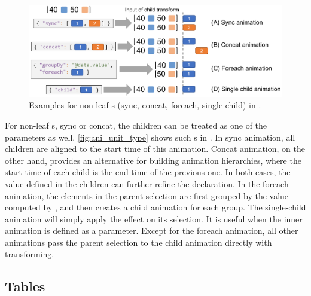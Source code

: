 \begin{figure}[h]
  \centering
  \includegraphics[width=\linewidth]{figs/ani_unit_type.pdf}
  \caption{
    Examples for non-leaf \aniunit{}s (sync, concat, foreach, single-child) in \gaia{}.
  }
  \label{fig:ani_unit_type}
\end{figure}

For non-leaf \aniunit{}s, \eg sync or concat, the children can be treated as one of the parameters as well.
\autoref{fig:ani_unit_type} shows such \aniunit{}s in \gaia{}.
In sync animation, all children are aligned to the start time of this animation.
Concat animation, on the other hand, provides an alternative for building animation hierarchies, where the start time of each child is the end time of the previous one.
In both cases, the  value defined in the children can further refine the declaration.
In the foreach animation, the elements in the parent selection are first grouped by the value computed by , and then \gaia{} creates a child animation for each group.
The single-child animation will simply apply the effect on its selection.
It is useful when the inner animation is defined as a parameter.
Except for the foreach animation, all other animations pass the parent selection to the child animation directly with transforming.

\subsection{Tables}

